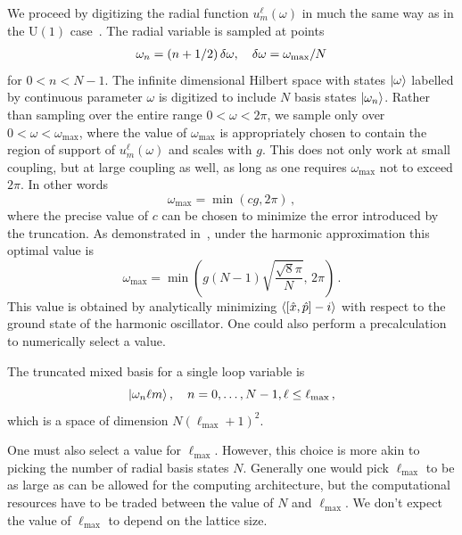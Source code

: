 \documentclass[reprint,superscriptaddress,pra,nofootinbib,preprintnumbers,floatfix]{revtex4-1}
\providecommand{\uone}{$\mathrm{U}(1)$\xspace}
\providecommand{\lMax}{\ell_\mathrm{max}}
\providecommand{\omMax}{\omega_\mathrm{max}}
\begin{document}
We proceed by digitizing the radial function $u^\ell_{m}(\omega)$ in much the same way as in the \uone case~\cite{Bauer:2021gek}. 
%
The radial variable is sampled at points
%
\begin{align}
    \omega_{n} = (n + 1/2) \,\delta \omega , \quad \delta \omega = \omega_{\rm{max}} / N
\end{align}
%
for $0<n<N-1$. 
%
The infinite dimensional Hilbert space with states $\ket{\omega}$ labelled by continuous parameter $\omega$ is digitized to include $N$ basis states $\ket{\omega_n}$. 
%
Rather than sampling over the entire range $0<\omega<2\pi$, we sample only over $0<\omega<\omMax$, where the value of $\omMax$ is appropriately chosen to contain the region of support of $u^\ell_m(\omega)$ and scales with $g$. 
%
This does not only work at small coupling, but at large coupling as well, as long as one requires $\omMax$ not to exceed $2\pi$. 
%
In other words
%
\begin{equation}
\label{eq:omega_max_def}
    \omMax = \min\left( c g, 2\pi\right) \,,
\end{equation}
%
where the precise value of $c$ can be chosen to minimize the error introduced by the truncation. 
%
As demonstrated in~\cite{macridin:2018, macridin:2018.2,Bauer:2021gup,Bauer:2021gek}, under the harmonic approximation this optimal value is
%
\begin{equation}\label{eq:omega_max}
    \omMax =  \min\left( g(N-1)\sqrt{\frac{\sqrt{8}\pi}{N}}, \, 2\pi \right) \,.
\end{equation}
%
This value is obtained by analytically minimizing $\ev{\comm{\hat{x}}{\hat{p}}-i}$ with respect to the ground state of the harmonic oscillator. 
%
One could also perform a precalculation to numerically select a value.



The truncated mixed basis for a single loop variable is
%
\begin{equation}
    \ket{\omega_n \ell m} \qc n=0,\dotsc,N-1, \ell \leq \lMax
    \,,
\end{equation}
%
which is a space of dimension $N(\lMax+1)^2$. 

One must also select a value for $\lMax$. 
%
However, this choice is more akin to picking the number of radial basis states $N$.
%
Generally one would pick $\lMax$ to be as large as can be allowed for the computing architecture, but the computational resources have to be traded between the value of $N$ and $\lMax$. 
%
We don't expect the value of $\lMax$ to depend on the lattice size.
\end{document}
